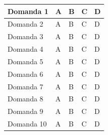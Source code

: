 \documentclass{article}
\begin{document}
\begin{longtable}{|l|m{3cm}|m{3cm}|m{3cm}|m{3cm}|}
    \hline
    Domanda 1  & A & B & C & D \\
    \hline
    Domanda 2  & A & B & C & D \\
    \hline
    Domanda 3  & A & B & C & D \\
    \hline
    Domanda 4  & A & B & C & D \\
    \hline
    Domanda 5  & A & B & C & D \\
    \hline
    Domanda 6  & A & B & C & D \\
    \hline
    Domanda 7  & A & B & C & D \\
    \hline
    Domanda 8  & A & B & C & D \\
    \hline
    Domanda 9  & A & B & C & D \\
    \hline
    Domanda 10 & A & B & C & D \\
    \hline
\end{longtable}
\end{document}
